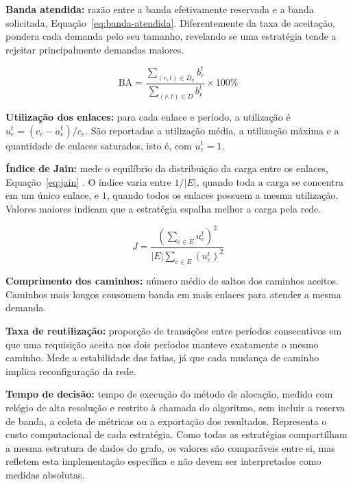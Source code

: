 \textbf{Banda atendida:} razão entre a banda efetivamente reservada e a banda solicitada, Equação~\ref{eq:banda-atendida}. Diferentemente da taxa de aceitação, pondera cada demanda pelo seu tamanho, revelando se uma estratégia tende a rejeitar principalmente demandas maiores.

\begin{equation}
    \text{BA} = \frac{\sum_{(r,t) \in D_a} b_r^t}{\sum_{(r,t) \in D} b_r^t} \times 100\%
    \label{eq:banda-atendida}
\end{equation}

\textbf{Utilização dos enlaces:} para cada enlace e período, a utilização é $u_e^t = (c_e - a_e^t) / c_e$. São reportadas a utilização média, a utilização máxima e a quantidade de enlaces saturados, isto é, com $u_e^t = 1$.

\textbf{Índice de Jain:} mede o equilíbrio da distribuição da carga entre os enlaces, Equação~\ref{eq:jain} \cite{jain1984}. O índice varia entre $1/|E|$, quando toda a carga se concentra em um único enlace, e $1$, quando todos os enlaces possuem a mesma utilização. Valores maiores indicam que a estratégia espalha melhor a carga pela rede.

\begin{equation}
    J = \frac{\left(\sum_{e \in E} u_e^t\right)^2}{|E| \sum_{e \in E} \left(u_e^t\right)^2}
    \label{eq:jain}
\end{equation}

\textbf{Comprimento dos caminhos:} número médio de saltos dos caminhos aceitos. Caminhos mais longos consomem banda em mais enlaces para atender a mesma demanda.

\textbf{Taxa de reutilização:} proporção de transições entre períodos consecutivos em que uma requisição aceita nos dois períodos manteve exatamente o mesmo caminho. Mede a estabilidade das fatias, já que cada mudança de caminho implica reconfiguração da rede.

\textbf{Tempo de decisão:} tempo de execução do método de alocação, medido com relógio de alta resolução e restrito à chamada do algoritmo, sem incluir a reserva de banda, a coleta de métricas ou a exportação dos resultados. Representa o custo computacional de cada estratégia. Como todas as estratégias compartilham a mesma estrutura de dados do grafo, os valores são comparáveis entre si, mas refletem esta implementação específica e não devem ser interpretados como medidas absolutas.

